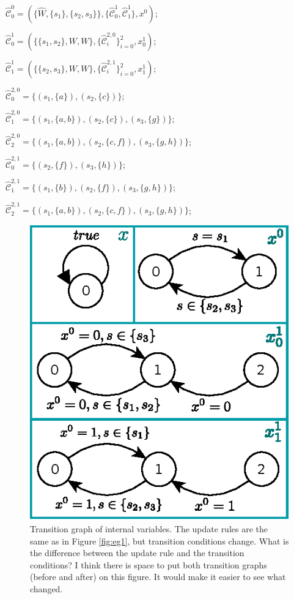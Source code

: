 $ \widehat{\mathcal{C}}^0_0 = (\{\widehat{W},\{s_1\},\{s_2,s_3\}\},\{\widehat{\mathcal{C}}^1_0, \widehat{\mathcal{C}}^1_1\},x^0) $;

$ \widehat{\mathcal{C}}^1_0 = (\{\{s_1,s_2\},W,W\},\{\widehat{\mathcal{C}}^{2,0}_i\}_{i=0}^2, x^1_0)$;

$ \widehat{\mathcal{C}}^1_1 = (\{\{s_2,s_3\},W,W\},\{\widehat{\mathcal{C}}^{2,1}_i\}_{i=0}^{2}, x^1_1)$;

$ \widehat{\mathcal{C}}^{2,0}_0 = \{(s_1,\{a\}),(s_2,\{c\})\} $;

$ \widehat{\mathcal{C}}^{2,0}_1 = \{(s_1,\{a,b\}),(s_2,\{c\}),(s_3,\{g\})\} $;

$ \widehat{\mathcal{C}}^{2,0}_2 = \{(s_1,\{a,b\}),(s_2,\{c,f\}),(s_3,\{g,h\})\} $; 

$ \widehat{\mathcal{C}}^{2,1}_0 = \{(s_2,\{f\}),(s_3,\{h\})\} $;

$ \widehat{\mathcal{C}}^{2,1}_1 = \{(s_1,\{b\}),(s_2,\{f\}), (s_3,\{g,h\})\} $;

$ \widehat{\mathcal{C}}^{2,1}_2 = \{(s_1,\{a,b\}),(s_2,\{c,f\}),(s_3,\{g,h\})\} $;

\begin{figure}
	\centering
	\includegraphics[width=0.7\linewidth]{pic/xupdate2}
	\caption{ Transition graph of internal variables. The update rules are the same as in Figure \ref{fig:eg1}, but transition conditions change. {\color{purple} What is the difference between the update rule and the transition conditions? I think there is space to put both transition graphs (before and after) on this figure. It would make it easier to see what changed.}}
	\label{fig:xupdate2}
\end{figure}

